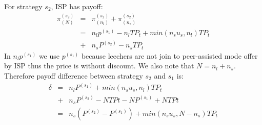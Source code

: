 \documentclass[paper]{ieice}
\begin{document}
For strategy $s_2$, ISP has payoff:
\begin{eqnarray}
	\pi^{(s_2)}_{(N)} &=& \pi^{(s_2)}_{(n_l)} + \pi^{(s_2)}_{(n_s)}\\
	\nonumber &=&n_l p^{(s_1)} - n_l T P_t + min (n_s u_s,n_l)T P_t\\
	&+&n_s P^{(s_2)} - n_s T P_t
\end{eqnarray}
In $n_l p^{(s_1)}$ we use $p^{(s_1)}$ because leechers are not join to peer-assisted mode offer by ISP thus the price is without discount.
We also note that $N=n_l + n_s$.
Therefore payoff difference between strategy $s_2$ and $s_1$ is:
\begin{eqnarray}
	\delta &=& n_l P^{(s_1)} + min (n_s u_s,n_l)T P_t \\
	&+& n_s P^{(s_2)} - N T Pt - N P^{(s_1)} + N T Pt\\
	&=& n_s (P^{(s_2)} - P^{(s_1)}) + min(n_s u_s , N-n_s) T P_t
\end{eqnarray}
\end{document}
